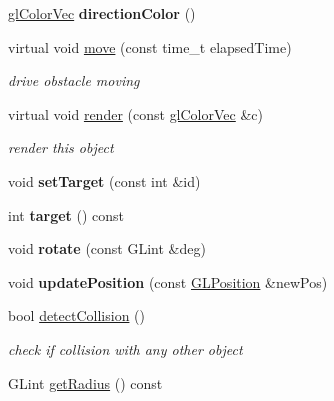 \begin{DoxyCompactItemize}
\item 
\hypertarget{classRobotClass_adcdf87caada18aeca7ee43b73a1f3010}{\hyperlink{Common_8h_a5113b6588451c418d38d8b3681eb6040}{gl\-Color\-Vec} {\bfseries direction\-Color} ()}\label{classRobotClass_adcdf87caada18aeca7ee43b73a1f3010}

\item 
\hypertarget{classRobotClass_a364ac0f9c65a4c2ee4d5b73a09f3ab34}{virtual void \hyperlink{classRobotClass_a364ac0f9c65a4c2ee4d5b73a09f3ab34}{move} (const time\-\_\-t elapsed\-Time)}\label{classRobotClass_a364ac0f9c65a4c2ee4d5b73a09f3ab34}

\begin{DoxyCompactList}\small\item\em drive obstacle moving \end{DoxyCompactList}\item 
\hypertarget{classRobotClass_af2069bec3bb391b05676e154527674fa}{virtual void \hyperlink{classRobotClass_af2069bec3bb391b05676e154527674fa}{render} (const \hyperlink{Common_8h_a5113b6588451c418d38d8b3681eb6040}{gl\-Color\-Vec} \&c)}\label{classRobotClass_af2069bec3bb391b05676e154527674fa}

\begin{DoxyCompactList}\small\item\em render this object \end{DoxyCompactList}\item 
\hypertarget{classRobotClass_a723bf7484fefcc8860e606d9041f9c76}{void {\bfseries set\-Target} (const int \&id)}\label{classRobotClass_a723bf7484fefcc8860e606d9041f9c76}

\item 
\hypertarget{classRobotClass_ab8e01362440cf6a0b5eaa6deaceb1c5e}{int {\bfseries target} () const }\label{classRobotClass_ab8e01362440cf6a0b5eaa6deaceb1c5e}

\item 
\hypertarget{classRobotClass_a805c3afc1be17e30b228d33df3e194e8}{void {\bfseries rotate} (const G\-Lint \&deg)}\label{classRobotClass_a805c3afc1be17e30b228d33df3e194e8}

\item 
\hypertarget{classRobotClass_affdee45ae76e3408db1c1615439b5b02}{void {\bfseries update\-Position} (const \hyperlink{structGLPosition}{G\-L\-Position} \&new\-Pos)}\label{classRobotClass_affdee45ae76e3408db1c1615439b5b02}

\item 
\hypertarget{classRobotClass_a1df74eb30a5bda3025eecd188ad42c54}{bool \hyperlink{classRobotClass_a1df74eb30a5bda3025eecd188ad42c54}{detect\-Collision} ()}\label{classRobotClass_a1df74eb30a5bda3025eecd188ad42c54}

\begin{DoxyCompactList}\small\item\em check if collision with any other object \end{DoxyCompactList}\item 
G\-Lint \hyperlink{classRobotClass_a61a9c5217fb1092668c55864b7e4bad0}{get\-Radius} () const 
\end{DoxyCompactItemize}
